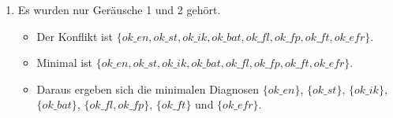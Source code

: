 \documentclass[a4paper]{scrartcl}
\begin{document}
\begin{enumerate}
    \item Es wurden nur Geräusche 1 und 2 gehört.
        \begin{itemize}
            \item Der Konflikt ist
                $\{ok\_en, ok\_st, ok\_ik, ok\_bat, ok\_fl,ok\_fp, ok\_ft,
                ok\_efr\}$.
            \item Minimal ist
                $\{ok\_en, ok\_st, ok\_ik, ok\_bat, ok\_fl,ok\_fp, ok\_ft,
                ok\_efr\}$.
            \item Daraus ergeben sich die minimalen Diagnosen
                $\{ok\_en\}$, $\{ok\_st\}$, $\{ok\_ik\}$, $\{ok\_bat\}$,
                $\{ok\_fl,ok\_fp\}$, $\{ok\_ft\}$ und $\{ok\_efr\}$.
        \end{itemize}

\end{enumerate}
\end{document}
